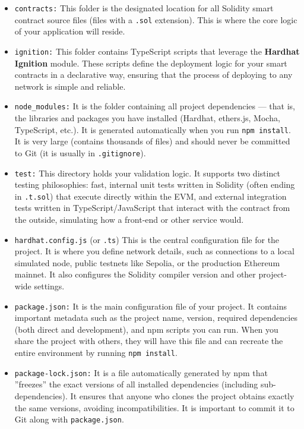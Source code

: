 \documentclass{scrbook}
\begin{document}
\begin{itemize}
    \item
    \texttt{contracts:} This folder is the designated location for all Solidity smart contract source files (files with a \texttt{.sol} extension). This is where the core logic of your application will reside.

    \item
    \texttt{ignition:} This folder contains TypeScript scripts that leverage the \textbf{Hardhat Ignition} module. These scripts define the deployment logic for your smart contracts in a declarative way, ensuring that the process of deploying to any network is simple and reliable.

    \item
    \texttt{node\_modules:} It is the folder containing all project dependencies — that is, the libraries and packages you have installed (Hardhat, ethers.js, Mocha, TypeScript, etc.). It is generated automatically when you run \texttt{npm install}. It is very large (contains thousands of files) and should never be committed to Git (it is usually in \texttt{.gitignore}).
    
    \item
    \texttt{test:} This directory holds your validation logic. It supports two distinct testing philosophies: fast, internal unit tests written in Solidity (often ending in \texttt{.t.sol}) that execute directly within the EVM, and external integration tests written in TypeScript/JavaScript that interact with the contract from the outside, simulating how a front-end or other service would.
    
    \item
    \texttt{hardhat.config.js} (or \texttt{.ts}) This is the central configuration file for the project. It is where you define network details, such as connections to a local simulated node, public testnets like Sepolia, or the production Ethereum mainnet. It also configures the Solidity compiler version and other project-wide settings.

    \item
    \texttt{package.json:} It is the main configuration file of your project. It contains important metadata such as the project name, version, required dependencies (both direct and development), and npm scripts you can run. When you share the project with others, they will have this file and can recreate the entire environment by running \texttt{npm install}.

    \item
    \texttt{package-lock.json:} It is a file automatically generated by npm that ''freezes'' the exact versions of all installed dependencies (including sub-dependencies). It ensures that anyone who clones the project obtains exactly the same versions, avoiding incompatibilities. It is important to commit it to Git along with \texttt{package.json}.


\end{itemize}
\end{document}
